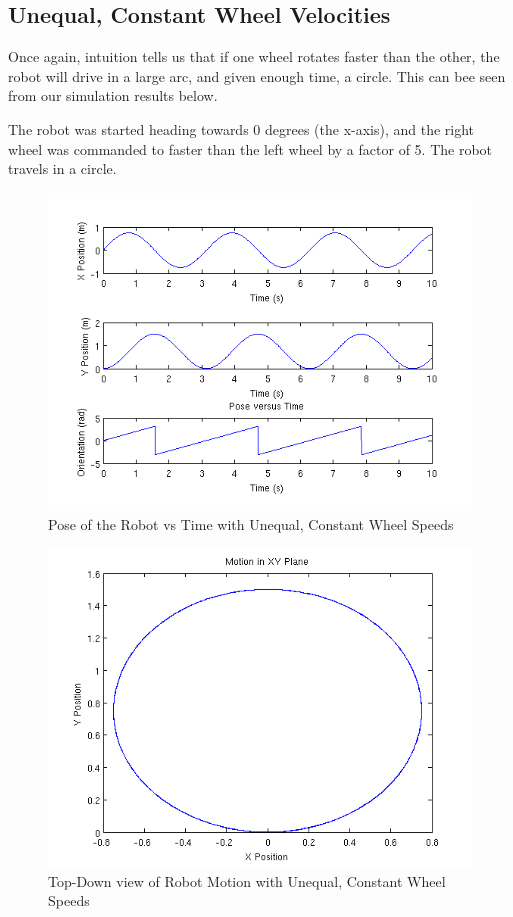 \documentclass[10pt]{amsart}
\begin{document}
\newpage
\subsection{Unequal, Constant Wheel Velocities}
Once again, intuition tells us that if one wheel rotates faster than the other, the robot will drive in a large arc, and given enough time, a circle.  This can bee seen from our simulation results below.

The robot was started heading towards 0 degrees (the x-axis), and the right wheel was commanded to faster than the left wheel by a factor of 5.  The robot travels in a circle.

\begin{figure}[h]
 \centering
 \includegraphics[scale=0.5,keepaspectratio=true]{unequalconstantpose.png}
 \caption{Pose of the Robot vs Time with Unequal, Constant Wheel Speeds}
 \label{fig:unequalconstantpose}
\end{figure}

\begin{figure}[h]
 \centering
 \includegraphics[scale=0.5,keepaspectratio=true]{unequalconstantplane.png}
 \caption{Top-Down view of Robot Motion with Unequal, Constant Wheel Speeds}
 \label{fig:unequalconstantplane}
\end{figure}
\end{document}

